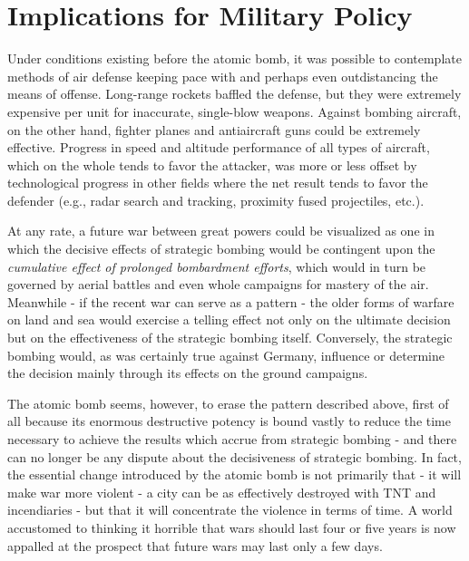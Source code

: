 
\chapter{Implications for Military Policy}

\vspace{-2pt}


\vspace{39pt}

Under conditions existing before the atomic bomb, it was possible to contemplate methods of air defense keeping pace with and perhaps even outdistancing the means of offense. Long-range rockets baffled the defense, but they were extremely expensive per unit for inaccurate, single-blow weapons. Against bombing aircraft, on the other hand, fighter planes and antiaircraft guns could be extremely effective. Progress in speed and altitude performance of all types of aircraft, which on the whole tends to favor the attacker, was more or less offset by technological progress in other fields where the net result tends to favor the defender (e.g., radar search and tracking, proximity fused projectiles, etc.).

At any rate, a future war between great powers could be visualized as one in which the decisive effects of strategic bombing would be contingent upon the \emph{cumulative effect of prolonged bombardment efforts}, which would in turn be governed by aerial battles and even whole campaigns for mastery of the air. Meanwhile - if the recent war can serve as a pattern - the older forms of warfare on land and sea would exercise a telling effect not only on the ultimate decision but on the effectiveness of the strategic bombing itself. Conversely, the strategic bombing would, as was certainly true against Germany, influence or determine the decision mainly through its effects on the ground campaigns.

The atomic bomb seems, however, to erase the pattern described above, first of all because its enormous destructive potency is bound vastly to reduce the time necessary to achieve the results which accrue from strategic bombing - and there can no longer be any dispute about the decisiveness of strategic bombing. In fact, the essential change introduced by the atomic bomb is not primarily that - it will make war more violent - a city can be as effectively destroyed with TNT and incendiaries - but that it will concentrate the violence in terms of time. A world accustomed to thinking it horrible that wars should last four or five years is now appalled at the prospect that future wars may last only a few days.

